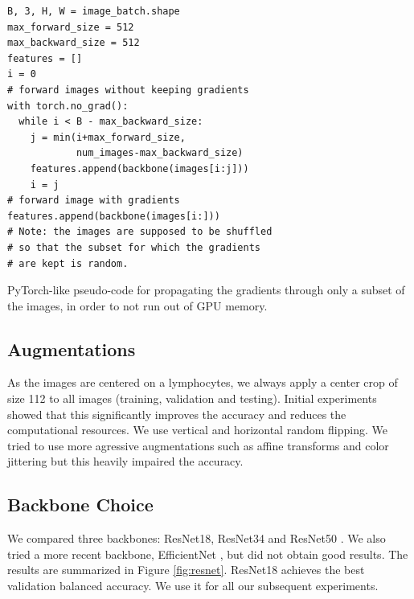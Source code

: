 \documentclass[final]{cvpr}
\begin{document}
\begin{table}[h]
	\renewcommand\tablename{Pseudo-code}
	\begin{Verbatim}[fontsize=\footnotesize, samepage=true, frame=single]
B, 3, H, W = image_batch.shape
max_forward_size = 512
max_backward_size = 512
features = []
i = 0
# forward images without keeping gradients
with torch.no_grad():
  while i < B - max_backward_size:
    j = min(i+max_forward_size,
            num_images-max_backward_size)
    features.append(backbone(images[i:j]))
    i = j
# forward image with gradients
features.append(backbone(images[i:]))
# Note: the images are supposed to be shuffled
# so that the subset for which the gradients
# are kept is random.
	\end{Verbatim}
    \caption{PyTorch-like pseudo-code for propagating the gradients through only a subset of the images, in order to not run out of GPU memory.}
	\label{alg1}
\end{table}




\subsection{Augmentations}
As the images are centered on a lymphocytes, we always apply a center crop of size 112 to all images (training, validation and testing). Initial experiments showed that this significantly improves the accuracy and reduces the computational resources. We use vertical and horizontal random flipping. We tried to use more agressive augmentations such as affine transforms and color jittering but this heavily impaired the accuracy.

\subsection{Backbone Choice}
We compared three backbones: ResNet18, ResNet34 and ResNet50 \cite{resnet}. We also tried a more recent backbone, EfficientNet \cite{efn}, but did not obtain good results.
The results are summarized in Figure \ref{fig:resnet}. ResNet18 achieves the best validation balanced accuracy. We use it for all our subsequent experiments.
\end{document}
